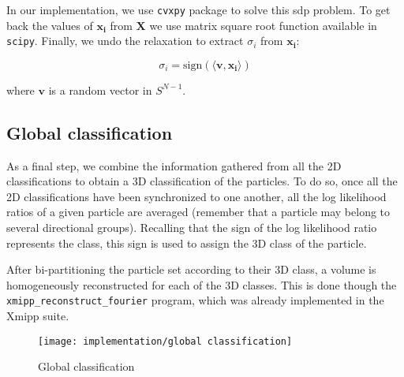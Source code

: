 \documentclass[../main.tex]{subfiles}
\begin{document}
In our implementation, we use \texttt{cvxpy}\cite{agrawal2018}\cite{diamond2016} package to solve this \gls{sdp} problem. To get back the values of $\bm{x_i}$ from $\bm{X}$ we use matrix square root function available in \texttt{scipy}\cite{virtanen2020}. Finally, we undo the relaxation to extract $\sigma_i$ from $\bm{x_i}$\cite{kemal2008}:

\begin{equation}
    \sigma_i = \text{sign}(\langle \bm{v}, \bm{x_i} \rangle)
\end{equation}

where $\bm{v}$ is a random vector in $S^{N-1}$.

\subsection{Global classification}
As a final step, we combine the information gathered from all the 2D classifications to obtain a 3D classification of the particles. To do so, once all the 2D classifications have been synchronized to one another, all the log likelihood ratios of a given particle are averaged (remember that a particle may belong to several directional groups). Recalling that the sign of the log likelihood ratio represents the class, this sign is used to assign the 3D class of the particle.

After bi-partitioning the particle set according to their 3D class, a volume is homogeneously reconstructed for each of the 3D classes. This is done though the \texttt{xmipp\_reconstruct\_fourier} program, which was already implemented in the Xmipp suite\cite{strelak2019}.

\begin{figure}
    \centering
    \texttt{[image: implementation/global classification]}
    \caption{Global classification}
    \label{fig:4.1:global}
\end{figure}
\end{document}
